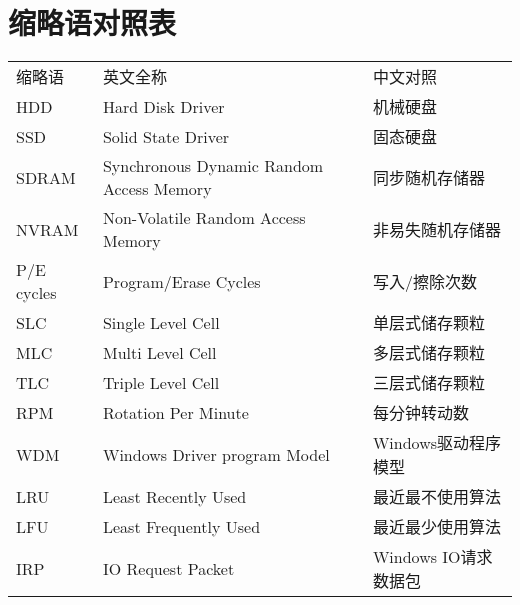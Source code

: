
\chapter*{缩略语对照表}

\begin{tabular}{lll}
缩略语 & 英文全称 & 中文对照\\
HDD        & Hard Disk Driver & 机械硬盘\\
SSD        & Solid State Driver & 固态硬盘\\
SDRAM      & Synchronous Dynamic Random Access Memory & 同步随机存储器\\
NVRAM      & Non-Volatile Random Access Memory & 非易失随机存储器\\
P/E cycles & Program/Erase Cycles & 写入/擦除次数\\
SLC        & Single Level Cell & 单层式储存颗粒\\
MLC        & Multi Level Cell & 多层式储存颗粒\\
TLC        & Triple Level Cell & 三层式储存颗粒\\
RPM        & Rotation Per Minute & 每分钟转动数\\
WDM        & Windows Driver program Model & Windows驱动程序模型\\
LRU        & Least Recently Used & 最近最不使用算法\\
LFU        & Least Frequently Used & 最近最少使用算法\\
IRP        & IO Request Packet & Windows IO请求数据包\\
\end{tabular}
